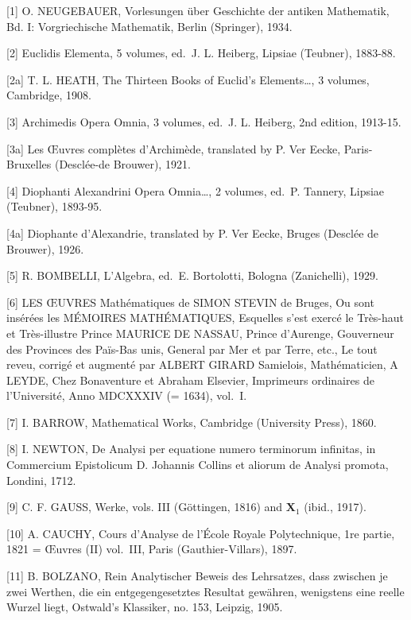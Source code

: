
{[}1{]} O. NEUGEBAUER, Vorlesungen über Geschichte der antiken Mathematik, Bd. I: Vorgriechische Mathematik, Berlin (Springer), 1934.

{[}2{]} Euclidis Elementa, 5 volumes, ed.~J. L. Heiberg, Lipsiae (Teubner), 1883-88.

{[}2a{]} T. L. HEATH, The Thirteen Books of Euclid's Elements\ldots, 3 volumes, Cambridge, 1908.

{[}3{]} Archimedis Opera Omnia, 3 volumes, ed.~J. L. Heiberg, 2nd edition, 1913-15.

{[}3a{]} Les Œuvres complètes d'Archimède, translated by P. Ver Eecke, Paris-Bruxelles (Desclée-de Brouwer), 1921.

{[}4{]} Diophanti Alexandrini Opera Omnia\ldots, 2 volumes, ed.~P. Tannery, Lipsiae (Teubner), 1893-95.

{[}4a{]} Diophante d'Alexandrie, translated by P. Ver Eecke, Bruges (Desclée de Brouwer), 1926.

{[}5{]} R. BOMBELLI, L'Algebra, ed.~E. Bortolotti, Bologna (Zanichelli), 1929.

{[}6{]} LES ŒUVRES Mathématiques de SIMON STEVIN de Bruges, Ou sont insérées les MÉMOIRES MATHÉMATIQUES, Esquelles s'est exercé le Très-haut et Très-illustre Prince MAURICE DE NASSAU, Prince d'Aurenge, Gouverneur des Provinces des Païs-Bas unis, General par Mer et par Terre, etc., Le tout reveu, corrigé et augmenté par ALBERT GIRARD Samielois, Mathématicien, A LEYDE, Chez Bonaventure et Abraham Elsevier, Imprimeurs ordinaires de l'Université, Anno MDCXXXIV (= 1634), vol.~I.

{[}7{]} I. BARROW, Mathematical Works, Cambridge (University Press), 1860.

{[}8{]} I. NEWTON, De Analysi per equatione numero terminorum infinitas, in Commercium Epistolicum D. Johannis Collins et aliorum de Analysi promota, Londini, 1712.

{[}9{]} C. F. GAUSS, Werke, vols. III (Göttingen, 1816) and \(\mathbf{X}_1\) (ibid., 1917).

{[}10{]} A. CAUCHY, Cours d'Analyse de l'École Royale Polytechnique, 1re partie, 1821 = Œuvres (II) vol.~III, Paris (Gauthier-Villars), 1897.

{[}11{]} B. BOLZANO, Rein Analytischer Beweis des Lehrsatzes, dass zwischen je zwei Werthen, die ein entgegengesetztes Resultat gewähren, wenigstens eine reelle Wurzel liegt, Ostwald's Klassiker, no. 153, Leipzig, 1905.

